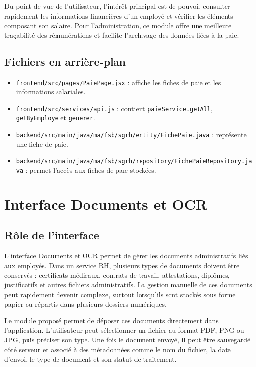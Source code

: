 \documentclass[12pt,a4paper]{report}
\begin{document}
Du point de vue de l'utilisateur, l'intérêt principal est de pouvoir consulter rapidement les informations financières d'un employé et vérifier les éléments composant son salaire. Pour l'administration, ce module offre une meilleure traçabilité des rémunérations et facilite l'archivage des données liées à la paie.

\subsection{Fichiers en arrière-plan}

\begin{itemize}
    \item \texttt{frontend/src/pages/PaiePage.jsx} : affiche les fiches de paie et les informations salariales.
    \item \texttt{frontend/src/services/api.js} : contient \texttt{paieService.getAll}, \texttt{getByEmploye} et \texttt{generer}.
    \item \texttt{backend/src/main/java/ma/fsb/sgrh/entity/FichePaie.java} : représente une fiche de paie.
    \item \texttt{backend/src/main/java/ma/fsb/sgrh/repository/FichePaieRepository.java} : permet l'accès aux fiches de paie stockées.
\end{itemize}

\section{Interface Documents et OCR}

\subsection{Rôle de l'interface}

L'interface Documents et OCR permet de gérer les documents administratifs liés aux employés. Dans un service RH, plusieurs types de documents doivent être conservés : certificats médicaux, contrats de travail, attestations, diplômes, justificatifs et autres fichiers administratifs. La gestion manuelle de ces documents peut rapidement devenir complexe, surtout lorsqu'ils sont stockés sous forme papier ou répartis dans plusieurs dossiers numériques.

Le module proposé permet de déposer ces documents directement dans l'application. L'utilisateur peut sélectionner un fichier au format PDF, PNG ou JPG, puis préciser son type. Une fois le document envoyé, il peut être sauvegardé côté serveur et associé à des métadonnées comme le nom du fichier, la date d'envoi, le type de document et son statut de traitement.
\end{document}
